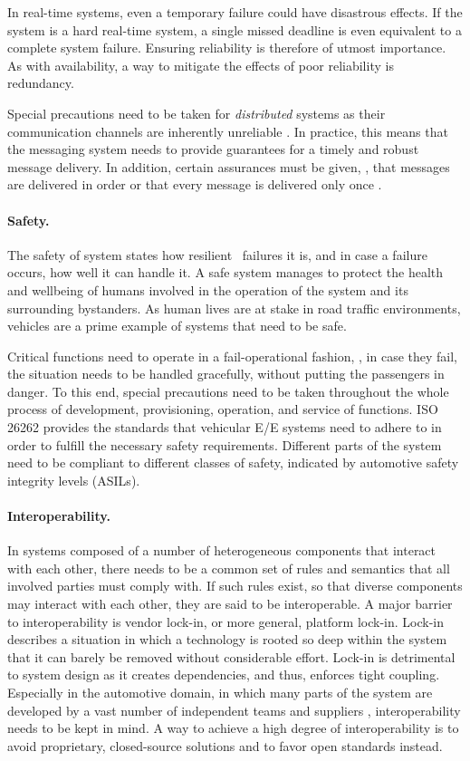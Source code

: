 In real-time systems, even a temporary failure could have disastrous effects. If the system is a hard real-time system, a single missed deadline is even equivalent to a complete system failure. Ensuring reliability is therefore of utmost importance. As with availability, a way to mitigate the effects of poor reliability is redundancy.

Special precautions need to be taken for \emph{distributed} systems as their communication channels are inherently unreliable \cite{tanenbaum2017distributed}. In practice, this means that the messaging system needs to provide guarantees for a timely and robust message delivery. In addition, certain assurances must be given, \eg , that messages are delivered in order or that every message is delivered only once \cite{o2007quality}. 

\paragraph{Safety.}
The safety of system states how resilient \wrt\ failures it is, and in case a failure occurs, how well it can handle it. A safe system manages to protect the health and wellbeing of humans involved in the operation of the system and its surrounding bystanders.
As human lives are at stake in road traffic environments, vehicles are a prime example of systems that need to be safe.

Critical functions need to operate in a fail-operational fashion, \ie , in case they fail, the situation needs to be handled gracefully, without putting the passengers in danger. To this end, special precautions need to be taken throughout the whole process of development, provisioning, operation, and service of functions. ISO 26262 \cite{iso201126262} provides the standards that vehicular E/E systems need to adhere to in order to fulfill the necessary safety requirements. Different parts of the system need to be compliant to different classes of safety, indicated by automotive safety integrity levels (ASILs).

\paragraph{Interoperability.} 
In systems composed of a number of heterogeneous components that interact with each other, there needs to be a common set of rules and semantics that all involved parties must comply with. If such rules exist, so that diverse components may interact with each other, they are said to be interoperable.
A major barrier to interoperability is vendor lock-in, or more general, platform lock-in. Lock-in describes a situation in which a technology is rooted so deep within the system that it can barely be removed without considerable effort. Lock-in is detrimental to system design as it creates dependencies, and thus, enforces tight coupling. Especially in the automotive domain, in which many parts of the system are developed by a vast number of independent teams and suppliers \cite{broy2006challenges}, interoperability needs to be kept in mind. A way to achieve a high degree of interoperability is to avoid proprietary, closed-source solutions and to favor open standards instead.

